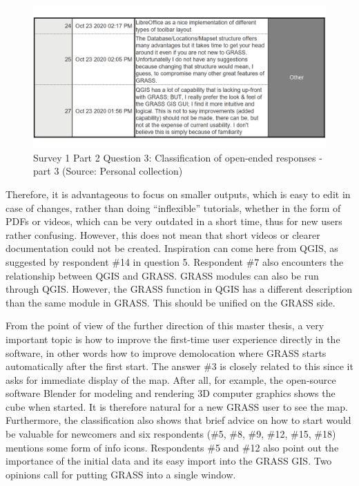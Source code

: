 \documentclass[a4paper,10pt,twoside]{article}
\begin{document}
\newpage
\vspace{0.3cm}
\begin{figure}[hbt!] 
\begin{center}
\includegraphics[width=15cm]{../surveys/analyzed_data/survey1_part2_question3_open_ended-2_1} 
\caption[Survey 1 Part 2 Question 3: Classification of open-ended responses - part 3]{Survey 1 Part 2 Question 3: Classification of open-ended responses - part 3 (Source: Personal collection)}
\label{fig:survey1_part2_question3_open_ended3_1}
\end{center}
\end{figure}

\noindent Therefore, it is advantageous to focus on smaller outputs,
which is easy to edit in case of changes, rather than doing
``inflexible'' tutorials, whether in the form of PDFs or videos, which
can be very outdated in a short time, thus for new users rather
confusing. However, this does not mean that short videos or clearer
documentation could not be created. Inspiration can come here from
QGIS, as suggested by respondent \#14 in question 5. Respondent \#7
also encounters the relationship between QGIS and GRASS. GRASS modules 
can also be run through QGIS. However, the GRASS function in QGIS has a different description
than the same module in GRASS. This should be unified on the GRASS
side.

From the point of view of the further direction of this master thesis,
a very important topic is how to improve the first-time user
experience directly in the software, in other words how to improve
demolocation where GRASS starts automatically after the first
start. The answer \#3 is closely related to this since it asks for
immediate display of the map. After all, for example, the open-source
software Blender for modeling and rendering 3D computer graphics shows
the cube when started. It is therefore natural for a new GRASS user to
see the map. Furthermore, the classification also shows that brief
advice on how to start would be valuable for newcomers and six
respondents (\#5, \#8, \#9, \#12, \#15, \#18) mentions some form of
info icons. Respondents \#5 and \#12 also point out the importance of
the initial data and its easy import into the GRASS GIS. Two opinions
call for putting GRASS into a single window.
\end{document}

